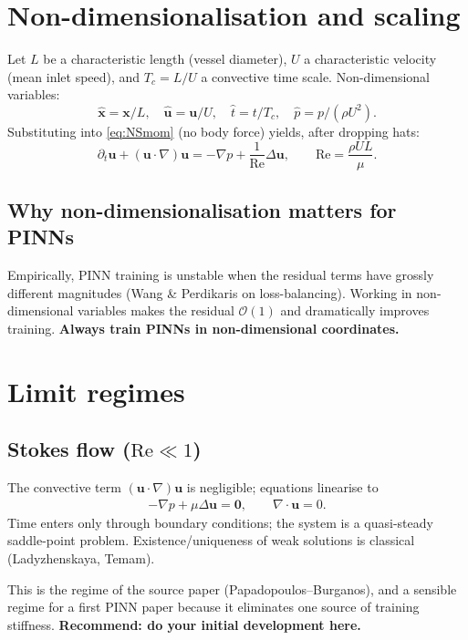 \documentclass[11pt]{article}
\begin{document}
\section{Non-dimensionalisation and scaling}

Let $L$ be a characteristic length (vessel diameter), $U$ a characteristic velocity (mean inlet speed), and $T_c = L/U$ a convective time scale. Non-dimensional variables:
\[
\hat{\mathbf{x}} = \mathbf{x}/L, \quad \hat{\mathbf{u}} = \mathbf{u}/U, \quad \hat{t} = t/T_c, \quad \hat{p} = p/(\rho U^2).
\]
Substituting into \eqref{eq:NSmom} (no body force) yields, after dropping hats:
\begin{equation}
\partial_t \mathbf{u} + (\mathbf{u}\cdot\nabla)\mathbf{u} = -\nabla p + \frac{1}{\mathrm{Re}}\Delta\mathbf{u}, \qquad \mathrm{Re} = \frac{\rho U L}{\mu}.
\label{eq:NSnondim}
\end{equation}

\subsection*{Why non-dimensionalisation matters for PINNs}
Empirically, PINN training is unstable when the residual terms have grossly different magnitudes (Wang \& Perdikaris on loss-balancing). Working in non-dimensional variables makes the residual $\mathcal{O}(1)$ and dramatically improves training. \textbf{Always train PINNs in non-dimensional coordinates.}

\section{Limit regimes}

\subsection*{Stokes flow ($\mathrm{Re} \ll 1$)}
The convective term $(\mathbf{u}\cdot\nabla)\mathbf{u}$ is negligible; equations linearise to
\begin{align}
-\nabla p + \mu \Delta \mathbf{u} = \mathbf{0}, \qquad \nabla\cdot\mathbf{u} = 0. \label{eq:Stokes}
\end{align}
Time enters only through boundary conditions; the system is a quasi-steady saddle-point problem. Existence/uniqueness of weak solutions is classical (Ladyzhenskaya, Temam).

This is the regime of the source paper (Papadopoulos--Burganos), and a sensible regime for a first PINN paper because it eliminates one source of training stiffness. \textbf{Recommend: do your initial development here.}
\end{document}
